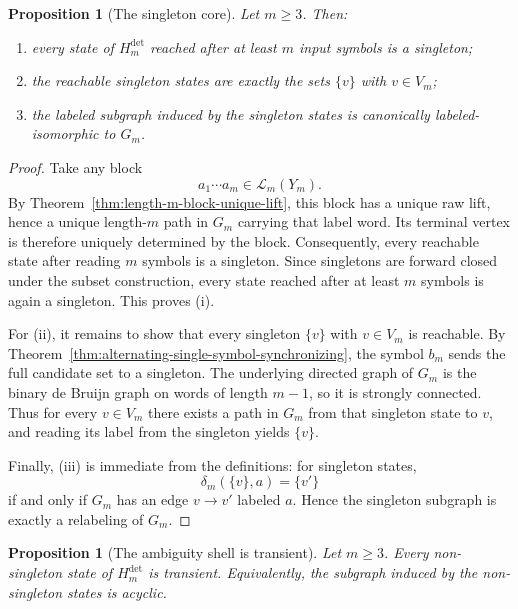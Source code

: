 \documentclass[11pt,letterpaper]{article}
\numberwithin{equation}{section}
\theoremstyle{plain}
\newtheorem{proposition}[theorem]{Proposition}
\theoremstyle{definition}
\theoremstyle{remark}
\begin{document}
\begin{proposition}[The singleton core]
\label{prop:deterministic-singleton-core}
Let $m\ge 3$.  Then:
\begin{enumerate}[label=\textup{(\roman*)}]
\item every state of $H_m^{\mathrm{det}}$ reached after at least $m$ input
symbols is a singleton;
\item the reachable singleton states are exactly the sets $\{v\}$ with
$v\in V_m$;
\item the labeled subgraph induced by the singleton states is canonically
labeled-isomorphic to $G_m$.
\end{enumerate}
\end{proposition}

\begin{proof}
Take any block
\[
a_1\cdots a_m\in\mathcal L_m(Y_m).
\]
By Theorem~\ref{thm:length-m-block-unique-lift}, this block has a unique raw
lift, hence a unique length-$m$ path in $G_m$ carrying that label word.  Its
terminal vertex is therefore uniquely determined by the block.  Consequently,
every reachable state after reading $m$ symbols is a singleton.  Since
singletons are forward closed under the subset construction, every state reached
after at least $m$ symbols is again a singleton.  This proves
\textup{(i)}.

For \textup{(ii)}, it remains to show that every singleton $\{v\}$ with
$v\in V_m$ is reachable.  By
Theorem~\ref{thm:alternating-single-symbol-synchronizing}, the symbol $b_m$
sends the full candidate set to a singleton.  The
underlying directed graph of $G_m$ is the binary de Bruijn graph on words of
length $m-1$, so it is strongly connected.  Thus for every $v\in V_m$ there
exists a path in $G_m$ from that singleton state to $v$, and reading its label
from the singleton yields $\{v\}$.

Finally, \textup{(iii)} is immediate from the definitions: for singleton states,
\[
\delta_m(\{v\},a)=\{v'\}
\]
if and only if $G_m$ has an edge $v\to v'$ labeled $a$.  Hence the singleton
subgraph is exactly a relabeling of $G_m$.
\end{proof}

\begin{proposition}[The ambiguity shell is transient]
\label{prop:deterministic-ambiguity-transient}
Let $m\ge 3$.  Every non-singleton state of $H_m^{\mathrm{det}}$ is transient.
Equivalently, the subgraph induced by the non-singleton states is acyclic.
\end{proposition}
\end{document}
